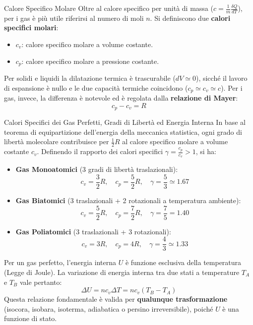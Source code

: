 \begin{definizione}{Calore Specifico Molare}
Oltre al calore specifico per unità di massa ($c = \frac{1}{m}\frac{\delta Q}{dT}$), per i gas è più utile riferirsi al numero di moli $n$. Si definiscono due \textbf{calori specifici molari}:
\begin{itemize}
    \item $c_v$: calore specifico molare a volume costante.
    \item $c_p$: calore specifico molare a pressione costante.
\end{itemize}
Per solidi e liquidi la dilatazione termica è trascurabile ($dV \simeq 0$), sicché il lavoro di espansione è nullo e le due capacità termiche coincidono ($c_p \simeq c_v \simeq c$). Per i gas, invece, la differenza è notevole ed è regolata dalla \textbf{relazione di Mayer}:
\begin{equation}
    c_p - c_v = R
\end{equation}
\end{definizione}

\begin{definizione}{Calori Specifici dei Gas Perfetti, Gradi di Libertà ed Energia Interna}
In base al teorema di equipartizione dell'energia della meccanica statistica, ogni grado di libertà molecolare contribuisce per $\frac{1}{2}R$ al calore specifico molare a volume costante $c_v$. Definendo il rapporto dei calori specifici $\gamma = \frac{c_p}{c_v} > 1$, si ha:
\begin{itemize}
    \item \textbf{Gas Monoatomici} (3 gradi di libertà traslazionali):
    \begin{equation}
        c_v = \frac{3}{2}R, \quad c_p = \frac{5}{2}R, \quad \gamma = \frac{5}{3} \simeq 1.67
    \end{equation}
    \item \textbf{Gas Biatomici} (3 traslazionali + 2 rotazionali a temperatura ambiente):
    \begin{equation}
        c_v = \frac{5}{2}R, \quad c_p = \frac{7}{2}R, \quad \gamma = \frac{7}{5} = 1.40
    \end{equation}
    \item \textbf{Gas Poliatomici} (3 traslazionali + 3 rotazionali):
    \begin{equation}
        c_v = 3R, \quad c_p = 4R, \quad \gamma = \frac{4}{3} \simeq 1.33
    \end{equation}
\end{itemize}
Per un gas perfetto, l'energia interna $U$ è funzione esclusiva della temperatura (Legge di Joule). La variazione di energia interna tra due stati a temperature $T_A$ e $T_B$ vale pertanto:
\begin{equation}
    \boxed{ \Delta U = n c_v \Delta T = n c_v (T_B - T_A) }
\end{equation}
Questa relazione fondamentale è valida per \textbf{qualunque trasformazione} (isocora, isobara, isoterma, adiabatica o persino irreversibile), poiché $U$ è una funzione di stato.
\end{definizione}

